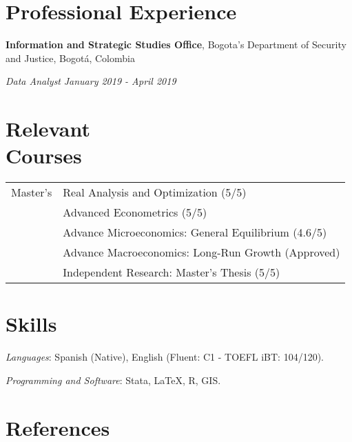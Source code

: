 \documentclass[margin,line]{res}
\begin{document}
\begin{resume}
\section{\sc Professional Experience}
{\bf Information and Strategic Studies Office}, Bogota's Department of Security and Justice, Bogotá, Colombia

\vspace{-.3cm}
{\em Data Analyst} \hfill \emph{January 2019 - April 2019}\\

\vspace{-.2cm}

\section{\sc Relevant \\ Courses}

\begin{tabular}{p{1.5cm}p{10cm}}
Master's & Real Analysis and Optimization (5/5)                 \\
         & Advanced Econometrics  (5/5)                         \\
         & Advance Microeconomics: General Equilibrium (4.6/5)  \\
         & Advance Macroeconomics: Long-Run Growth (Approved)   \\
         & Independent Research: Master's Thesis (5/5)          \\
\end{tabular}

\section{\sc Skills}

\textit{Languages}: Spanish (Native), English (Fluent: C1 - TOEFL iBT: 104/120).

\vspace{-.2cm}

\textit{Programming and Software}: Stata, {\LaTeX}, \textsc{R}, \textsc{GIS}. 

\section{\sc References}


\end{resume}
\end{document}
